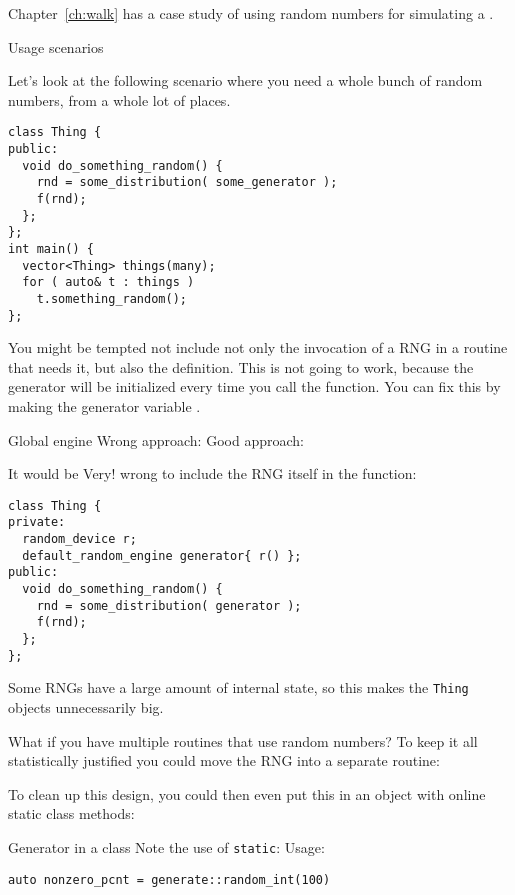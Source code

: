 \begin{exercise}
  Chapter~\ref{ch:walk} has a case study of using random numbers
  for simulating a .
\end{exercise}

 {Usage scenarios}

Let's look at the following scenario where you need a whole
bunch of random numbers, from a whole lot of places.

\begin{lstlisting}
class Thing {
public:
  void do_something_random() {
    rnd = some_distribution( some_generator );
    f(rnd);
  };
};
int main() {
  vector<Thing> things(many);
  for ( auto& t : things )
    t.something_random();
};
\end{lstlisting}

You might be tempted not include not only the invocation of a \ac{RNG}
in a routine that needs it, but also the definition.
This is not going to work, because the generator will be initialized
every time you call the function.
You can fix this by making the generator variable .

\begin{block}{Global engine}
  \label{sl:static-random}
  Wrong approach:
  Good approach:
\end{block}

\begin{remark}
  It would be Very! wrong to include the \ac{RNG} itself
  in the function:
\begin{lstlisting}
class Thing {
private:
  random_device r;
  default_random_engine generator{ r() };
public:
  void do_something_random() {
    rnd = some_distribution( generator );
    f(rnd);
  };
};
\end{lstlisting}
Some \acp{RNG} have a large amount of internal state,
so this makes the \lstinline{Thing} objects unnecessarily big.
\end{remark}

What if you have multiple routines that use random numbers?
To keep it all statistically justified you could move the
\ac{RNG} into a separate routine:

To clean up this design, you could then even put this in an object
with online static class methods:
\begin{block}{Generator in a class}
  \label{sl:static-rnd-class}
  Note the use of \lstinline{static}:
  Usage:
\begin{lstlisting}
auto nonzero_pcnt = generate::random_int(100)
\end{lstlisting}
\end{block}

